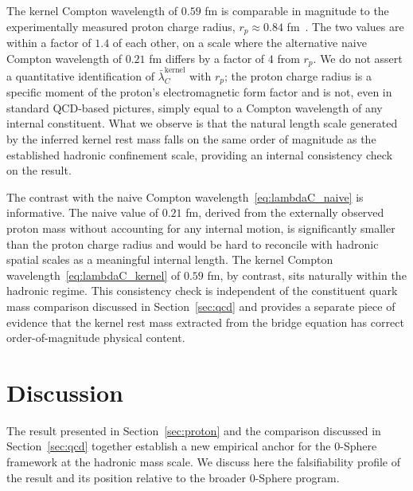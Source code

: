 \documentclass[%
 reprint, amsmath,amssymb, aps, prc, ]{revtex4-2}
\numberwithin{equation}{section}
\begin{document}
The kernel Compton wavelength of $0.59$ fm is comparable in magnitude to the experimentally measured proton charge radius, $r_p \approx 0.84$ fm~\cite{ProtonRadius}.
The two values are within a factor of $1.4$ of each other, on a scale where the alternative naive Compton wavelength of $0.21$ fm differs by a factor of $4$ from $r_p$.
We do not assert a quantitative identification of $\bar{\lambda}_C^{\text{kernel}}$ with $r_p$; the proton charge radius is a specific moment of the proton's electromagnetic form factor and is not, even in standard QCD-based pictures, simply equal to a Compton wavelength of any internal constituent.
What we observe is that the natural length scale generated by the inferred kernel rest mass falls on the same order of magnitude as the established hadronic confinement scale, providing an internal consistency check on the result.

The contrast with the naive Compton wavelength~\eqref{eq:lambdaC_naive} is informative.
The naive value of $0.21$ fm, derived from the externally observed proton mass without accounting for any internal motion, is significantly smaller than the proton charge radius and would be hard to reconcile with hadronic spatial scales as a meaningful internal length.
The kernel Compton wavelength~\eqref{eq:lambdaC_kernel} of $0.59$ fm, by contrast, sits naturally within the hadronic regime.
This consistency check is independent of the constituent quark mass comparison discussed in Section~\ref{sec:qcd} and provides a separate piece of evidence that the kernel rest mass extracted from the bridge equation has correct order-of-magnitude physical content.

\section{Discussion}
\label{sec:discussion}

The result presented in Section~\ref{sec:proton} and the comparison discussed in Section~\ref{sec:qcd} together establish a new empirical anchor for the 0-Sphere framework at the hadronic mass scale.
We discuss here the falsifiability profile of the result and its position relative to the broader 0-Sphere program.
\end{document}
